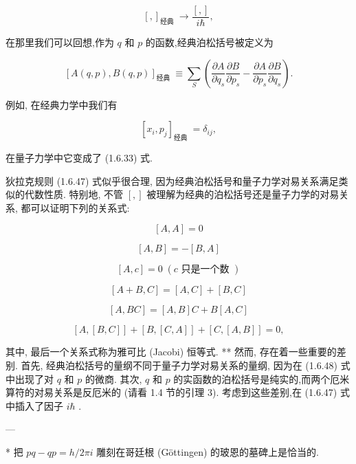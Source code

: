 \documentclass[lang=cn,newtx,10pt,scheme=chinese,thmcnt=section]{elegantbook}
\begin{document}
$$
{\left\lbrack ,\right\rbrack }_{\text{经典 }} \rightarrow \frac{\left\lbrack ,\right\rbrack }{i\hbar }, \tag{1.6.47}
$$

在那里我们可以回想,作为 $q$ 和 $p$ 的函数,经典泊松括号被定义为

$$
{\left\lbrack A\left( q, p\right), B\left( q, p\right) \right\rbrack }_{\text{经典 }} \equiv \mathop{\sum }\limits_{S}\left( {\frac{\partial A}{\partial {q}_{s}}\frac{\partial B}{\partial {p}_{s}} - \frac{\partial A}{\partial {p}_{s}}\frac{\partial B}{\partial {q}_{s}}}\right) . \tag{1.6.48}
$$

例如, 在经典力学中我们有

$$
{\left\lbrack {x}_{i},{p}_{j}\right\rbrack }_{\text{经典 }} = {\delta }_{ij}, \tag{1.6.49}
$$

在量子力学中它变成了 (1.6.33) 式.

狄拉克规则 (1.6.47) 式似乎很合理, 因为经典泊松括号和量子力学对易关系满足类似的代数性质. 特别地, 不管 $\left\lbrack ,\right\rbrack$ 被理解为经典的泊松括号还是量子力学的对易关系, 都可以证明下列的关系式:

$$
\left\lbrack {A, A}\right\rbrack = 0 \tag{1.6.50a}
$$

$$
\left\lbrack {A, B}\right\rbrack = - \left\lbrack {B, A}\right\rbrack \tag{1. 6. 50b}
$$

$$
\left\lbrack {A, c}\right\rbrack = 0\;\left( {c\text{ 只是一个数 }}\right) \tag{1.6.50c}
$$

$$
\left\lbrack {A + B, C}\right\rbrack = \left\lbrack {A, C}\right\rbrack + \left\lbrack {B, C}\right\rbrack \tag{1.6.50d}
$$

$$
\left\lbrack {A,{BC}}\right\rbrack = \left\lbrack {A, B}\right\rbrack C + B\left\lbrack {A, C}\right\rbrack \tag{1.6.50e}
$$

$$
\left\lbrack {A,\left\lbrack {B, C}\right\rbrack }\right\rbrack + \left\lbrack {B,\left\lbrack {C, A}\right\rbrack }\right\rbrack + \left\lbrack {C,\left\lbrack {A, B}\right\rbrack }\right\rbrack = 0, \tag{1.6.50f}
$$

其中, 最后一个关系式称为雅可比 (Jacobi) 恒等式. ** 然而, 存在着一些重要的差别. 首先, 经典泊松括号的量纲不同于量子力学对易关系的量纲, 因为在 (1.6.48) 式中出现了对 $q$ 和 $p$ 的微商. 其次, $q$ 和 $p$ 的实函数的泊松括号是纯实的,而两个厄米算符的对易关系是反厄米的 (请看 1.4 节的引理 3). 考虑到这些差别,在 (1.6.47) 式中插入了因子 $i\hbar$ .

---

* 把 ${pq} - {qp} = h/{2\pi i}$ 雕刻在哥廷根 (Göttingen) 的玻恩的墓碑上是恰当的.
\end{document}

